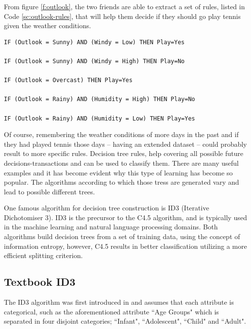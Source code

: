 From figure \ref{f:outlook}, the two friends are able to extract a set of rules, listed in Code \ref{sc:outlook-rules}, that will help them decide if they should go play tennis given the weather conditions.

{
\begin{verbatim}
IF (Outlook = Sunny) AND (Windy = Low) THEN Play=Yes

IF (Outlook = Sunny) AND (Windy = High) THEN Play=No

IF (Outlook = Overcast) THEN Play=Yes

IF (Outlook = Rainy) AND (Humidity = High) THEN Play=No

IF (Outlook = Rainy) AND (Humidity = Low) THEN Play=Yes
\end{verbatim}
\label{sc:outlook-rules}
}

Of course, remembering the weather conditions of more days in the past and if they had played tennis those days -- having an extended dataset -- could probably result to more specific rules.
Decision tree rules, help covering all possible future decisions\hyp transactions and can be used to classify them.
There are many useful examples and it has become evident why this type of learning has become so popular.
The algorithms according to which those tress are generated vary and lead to possible different trees.

One famous algorithm for decision tree construction is ID3 (Iterative Dichotomiser 3).
ID3 is the precursor to the C4.5 algorithm, and is typically used in the machine learning and natural language processing domains.
Both algorithms build decision trees from a set of training data, using the concept of information entropy, however, C4.5 results in better classification utilizing a more efficient splitting criterion.




\subsection{Textbook ID3}\label{s:id3}

The ID3 algorithm was first introduced in \cite{quinlan1986induction} and assumes that each attribute is categorical, such as the aforementioned attribute ``Age Groups" which is separated in four disjoint categories; ``Infant", ``Adolescent", ``Child" and ``Adult".

